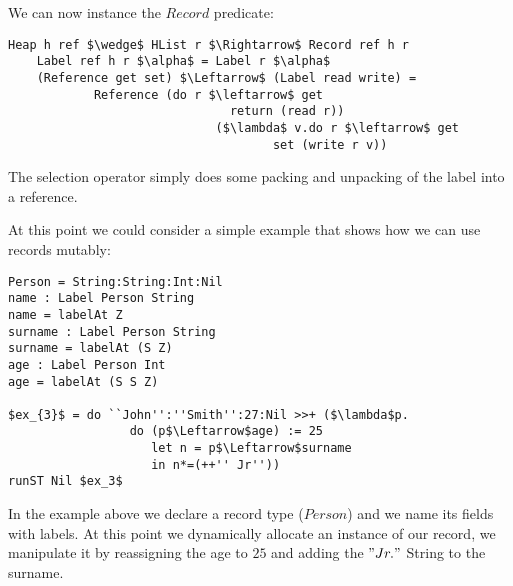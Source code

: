 \documentclass[a4paper]{article}
\begin{document}
We can now instance the $Record$ predicate:

\begin{lstlisting}
Heap h ref $\wedge$ HList r $\Rightarrow$ Record ref h r
    Label ref h r $\alpha$ = Label r $\alpha$
    (Reference get set) $\Leftarrow$ (Label read write) = 
            Reference (do r $\leftarrow$ get
                               return (read r))
                             ($\lambda$ v.do r $\leftarrow$ get
                                     set (write r v))
\end{lstlisting}

The selection operator simply does some packing and unpacking of the label into a reference.

\noindent At this point we could consider a simple example that shows how we can use records mutably:

\begin{lstlisting}
Person = String:String:Int:Nil
name : Label Person String
name = labelAt Z
surname : Label Person String
surname = labelAt (S Z)
age : Label Person Int
age = labelAt (S S Z)

$ex_{3}$ = do ``John'':''Smith'':27:Nil >>+ ($\lambda$p.
                 do (p$\Leftarrow$age) := 25
                    let n = p$\Leftarrow$surname
                    in n*=(++'' Jr''))
runST Nil $ex_3$
\end{lstlisting}

\noindent In the example above we declare a record type ($Person$) and we name its fields with labels. At this point we dynamically allocate an instance of our record, we manipulate it by reassigning the age to $25$ and adding the $"Jr."$ String to the surname.

\noindent 
\end{document}
